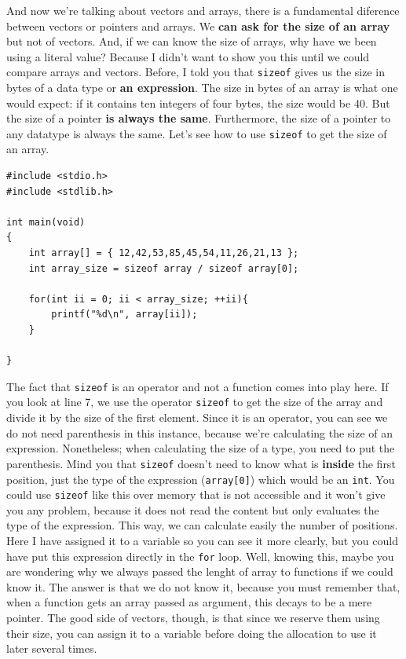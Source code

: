 \documentclass[a4paper]{article}
\begin{document}
And now we're talking about vectors and arrays, there is a fundamental diference
between vectors or pointers and arrays. We \textbf{can ask for the size of an
array} but not of vectors. And, if we can know the
size of arrays, why have we been using a literal value? Because I didn't want to
show you this until we could compare arrays and vectors. Before, I told you that
\verb!sizeof! gives us the size in bytes of a data type or
\textbf{an expression}. The size in bytes of an array is what one would expect:
if it contains ten integers of four bytes, the size would be 40. But the size of
a pointer \textbf{is always the same}. Furthermore, the size of a pointer to any
datatype is always the same. Let's see how to use \verb!sizeof! to get the size
of an array.

\noindent
\begin{minipage}[H]{\linewidth}
\mbox{}
\begin{lstlisting}[style=C, label={lst:sizeofArraysPointers},
caption={Difference of \texttt{sizeof} between pointers and arrays}]
#include <stdio.h>
#include <stdlib.h>

int main(void)
{
    int array[] = { 12,42,53,85,45,54,11,26,21,13 };
    int array_size = sizeof array / sizeof array[0];

    for(int ii = 0; ii < array_size; ++ii){
        printf("%d\n", array[ii]);
    }

}
\end{lstlisting}
\end{minipage}

The fact that \verb!sizeof! is an operator and not a function comes into play
here. If you look at line 7, we use the operator \verb!sizeof! to get the size
of the array and divide it by the size of the first element. Since it is
an operator, you can see we do not need parenthesis in this instance, because
we're calculating the size of an expression. Nonetheless;
when calculating the size of a type, you need to put the parenthesis.
Mind you that
\verb!sizeof! doesn't need to know what is \textbf{inside} the first position,
just the type of the expression (\verb!array[0]!) which would be an \verb"int".
You could use \verb!sizeof! like this over memory that is not accessible and
it won't give you any problem, because it does not read the content but only
evaluates the type of the expression.
This way, we can calculate
easily the number of positions. Here I have assigned it to a variable so you
can see it more clearly, but you could have put this expression directly in the
\verb!for! loop. Well, knowing this, maybe you are wondering why we always
passed the lenght of array to functions if we could know it. The answer is that
we do not know it, because you must remember that, when a function gets an array
passed as argument, this decays to be a mere pointer. The good side of vectors,
though, is that since we reserve them using their size, you can assign it
to a variable before doing the allocation to use it later several times.
\end{document}

